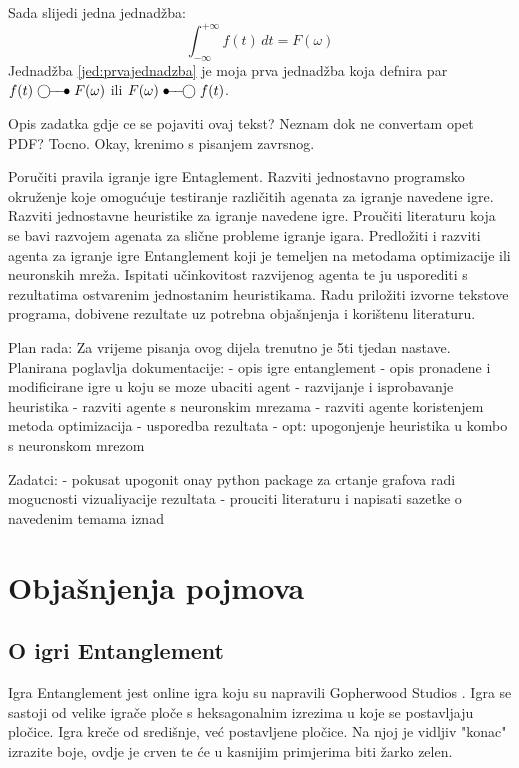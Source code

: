 \documentclass[zavrsnirad]{fer}
\begin{document}
Sada slijedi jedna jednadžba:
\begin{equation}
  \label{jed:prvajednadzba}
  \int_{-\infty}^{+\infty}f(t)\,dt=F(\omega)
\end{equation}
Jednadžba \eqref{jed:prvajednadzba} je moja prva jednadžba koja defnira par $f(t)\ufrek F(\omega)$ ili $F(\omega)\uvrem f(t)$.

Opis zadatka gdje ce se pojaviti ovaj tekst? Neznam dok ne convertam opet PDF? Tocno.
Okay, krenimo s pisanjem zavrsnog.

Poručiti pravila igranje igre Entaglement. Razviti jednostavno programsko okruženje koje omogućuje testiranje različitih agenata za igranje navedene igre. Razviti jednostavne heuristike za igranje navedene igre. Proučiti literaturu koja se bavi razvojem agenata za slične probleme igranje igara. Predložiti i razviti agenta za igranje igre Entanglement koji je temeljen na metodama optimizacije ili neuronskih mreža. Ispitati učinkovitost razvijenog agenta te ju usporediti s rezultatima ostvarenim jednostanim heuristikama. Radu priložiti izvorne tekstove programa, dobivene rezultate uz potrebna objašnjenja i korištenu literaturu.

Plan rada:
Za vrijeme pisanja ovog dijela trenutno je 5ti tjedan nastave.
Planirana poglavlja dokumentacije:
- opis igre entanglement
- opis pronadene i modificirane igre u koju se moze ubaciti agent
- razvijanje i isprobavanje heuristika
- razviti agente s neuronskim mrezama
- razviti agente koristenjem metoda optimizacija
- usporedba rezultata
- opt: upogonjenje heuristika u kombo s neuronskom mrezom

Zadatci:
- pokusat upogonit onay python package za crtanje grafova radi mogucnosti vizualiyacije rezultata
- prouciti literaturu i napisati sazetke o navedenim temama iznad



\chapter{Objašnjenja pojmova}
\label{pog:glavni_dio}

\section{O igri Entanglement}
\label{pog:o_igri}


Igra Entanglement jest online igra koju su napravili Gopherwood Studios \cite{gopherwoodstudios}. Igra se sastoji od velike igrače ploče s heksagonalnim izrezima u koje se postavljaju pločice. Igra kreče od središnje, već postavljene pločice. Na njoj je vidljiv "konac" izrazite boje, ovdje je crven te će u kasnijim primjerima biti žarko zelen.
\end{document}
